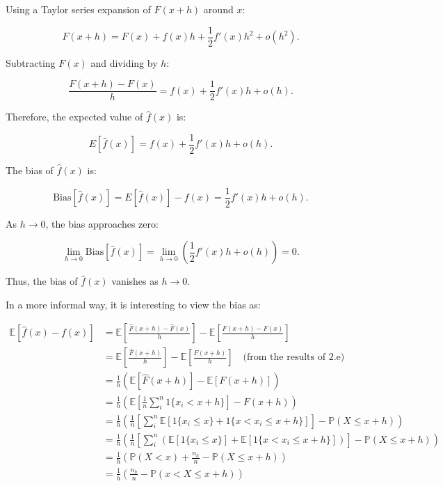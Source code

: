 \documentclass{article}
\begin{document}
Using a Taylor series expansion of \( F(x + h) \) around \( x \):

\[
F(x + h) = F(x) + f(x) h + \frac{1}{2} f'(x) h^2 + o(h^2).
\]

Subtracting \( F(x) \) and dividing by \( h \):

\[
\frac{F(x + h) - F(x)}{h} = f(x) + \frac{1}{2} f'(x) h + o(h).
\]

Therefore, the expected value of \( \hat{f}(x) \) is:

\[
E[\hat{f}(x)] = f(x) + \frac{1}{2} f'(x) h + o(h).
\]

The bias of \( \hat{f}(x) \) is:

\[
\text{Bias}[\hat{f}(x)] = E[\hat{f}(x)] - f(x) = \frac{1}{2} f'(x) h + o(h).
\]

As \( h \to 0 \), the bias approaches zero:

\[
\lim_{h \to 0} \text{Bias}[\hat{f}(x)] = \lim_{h \to 0} \left( \frac{1}{2} f'(x) h + o(h) \right) = 0.
\]

Thus, the bias of \( \hat{f}(x) \) vanishes as \( h \to 0 \).

In a more informal way, it is interesting to view the bias as:

\begin{align*}
  \mathbb{E}[\hat{f}(x) - f(x)] &=
  \mathbb{E}\left[\frac{\hat{F}(x + h) - \hat{F}(x)}{h}\right]
  - \mathbb{E}\left[\frac{F(x + h) - F(x)}{h}\right] \\
  &=
  \mathbb{E}\left[\frac{\hat{F}(x + h)}{h}\right]
  - \mathbb{E}\left[\frac{F(x + h)}{h}\right] \quad \text{(from the results of 2.e)}\\
  &=
  \frac{1}{h} \left(
    \mathbb{E}\left[\hat{F}(x + h)\right]
    - \mathbb{E}\left[F(x + h)\right]
  \right)
  \\
  &=
  \frac{1}{h} \left(
    \mathbb{E}\left[
      \frac{1}{n}\sum_i^n1 \{ x_i < x + h \}
    \right]
    - F(x + h)
  \right)
  \\
  &=
  \frac{1}{h} \left(
    \frac{1}{n}
    \left[
      \sum_i^n \mathbb{E}[1 \{ x_i \leq x \} + 1 \{ x < x_i \leq x + h \}]
    \right]
    - \mathbb{P}(X \leq x + h)
  \right)
  \\
  &=
  \frac{1}{h} \left(
    \frac{1}{n}
    \left[
      \sum_i^n \left(\mathbb{E}[1 \{ x_i \leq x \}] + \mathbb{E}[1 \{ x < x_i \leq x + h \}]\right)
    \right]
    - \mathbb{P}(X \leq x + h)
  \right)
  \\
  &=
  \frac{1}{h} \left(
    \mathbb{P}(X < x) + \frac{n_h}{n}
    - \mathbb{P}(X \leq x + h)
  \right)
  \\
  &=
  \frac{1}{h} \left(
    \frac{n_h}{n}
    - \mathbb{P}(x < X \leq x + h)
  \right)
\end{align*}
\end{document}
